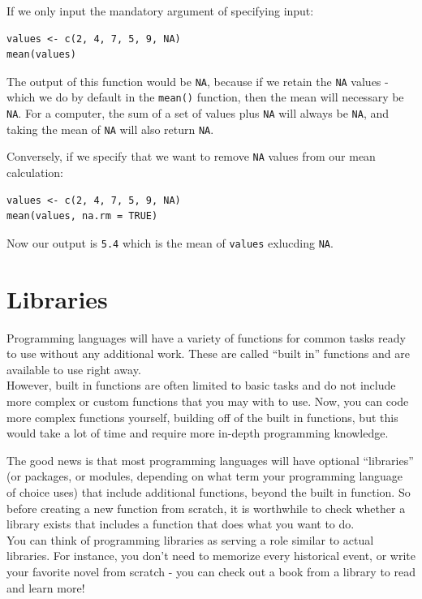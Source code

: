 \documentclass[
]{book}
\begin{document}
If we only input the mandatory argument of specifying input:

\begin{verbatim}
values <- c(2, 4, 7, 5, 9, NA)
mean(values)
\end{verbatim}

The output of this function would be \texttt{NA}, because if we retain the \texttt{NA} values - which we do by default in the \texttt{mean()} function, then the mean will necessary be \texttt{NA}. For a computer, the sum of a set of values plus \texttt{NA} will always be \texttt{NA}, and taking the mean of \texttt{NA} will also return \texttt{NA}.

Conversely, if we specify that we want to remove \texttt{NA} values from our mean calculation:

\begin{verbatim}
values <- c(2, 4, 7, 5, 9, NA)
mean(values, na.rm = TRUE)
\end{verbatim}

Now our output is \texttt{5.4} which is the mean of \texttt{values} exlucding \texttt{NA}.

\section{Libraries}\label{libraries}

Programming languages will have a variety of functions for common tasks ready to use without any additional work. These are called ``built in'' functions and are available to use right away.\\

However, built in functions are often limited to basic tasks and do not include more complex or custom functions that you may with to use. Now, you can code more complex functions yourself, building off of the built in functions, but this would take a lot of time and require more in-depth programming knowledge.

The good news is that most programming languages will have optional ``libraries'' (or packages, or modules, depending on what term your programming language of choice uses) that include additional functions, beyond the built in function. So before creating a new function from scratch, it is worthwhile to check whether a library exists that includes a function that does what you want to do.\\

You can think of programming libraries as serving a role similar to actual libraries. For instance, you don't need to memorize every historical event, or write your favorite novel from scratch - you can check out a book from a library to read and learn more!\\
\end{document}
